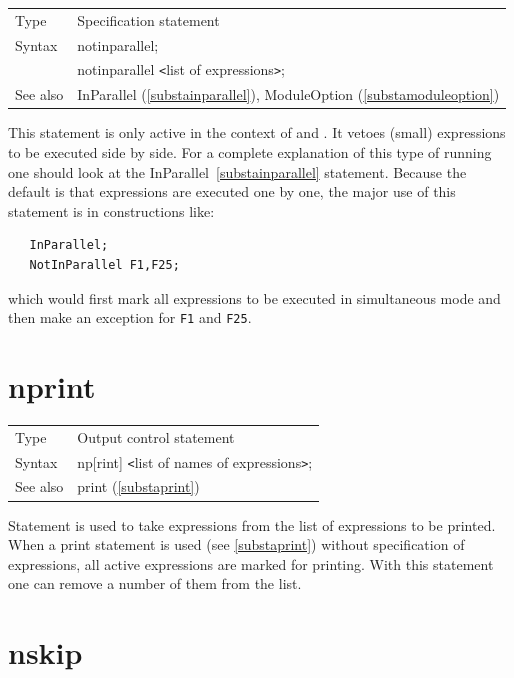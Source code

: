 \noindent \begin{tabular}{ll}
Type & Specification statement\\
Syntax & notinparallel; \\
       & notinparallel {\tt<}list of expressions{\tt>};
\\ See also & InParallel (\ref{substainparallel}), 
     ModuleOption (\ref{substamoduleoption})
\end{tabular} \vspace{4mm}

\noindent This statement is only active in the context of 
\TFORM{} and \ParFORM{}. It vetoes (small) expressions to be executed side by 
side. For a complete explanation of this type of running one should look at 
the InParallel~\ref{substainparallel} statement. Because the default is 
that expressions are executed one by one, the major use of this statement 
is in constructions like:
\begin{verbatim}
   InParallel;
   NotInParallel F1,F25;
\end{verbatim}
which would first mark all expressions to be executed in simultaneous mode 
and then make an exception for {\tt F1} and {\tt F25}.
\vspace{10mm}


\section{nprint}
\label{substanprint}

\noindent \begin{tabular}{ll}
Type & Output control statement\\
Syntax & np[rint] {\tt<}list of names of expressions{\tt>};
\\ See also & print (\ref{substaprint})
\end{tabular} \vspace{4mm}

\noindent Statement is used to take expressions from the list 
of expressions to be printed. When a print statement is used 
(see \ref{substaprint}) without specification of expressions, all active 
expressions are marked for printing. With this statement one can remove a 
number of them from the list. \vspace{10mm}


\section{nskip}
\label{substanskip}

